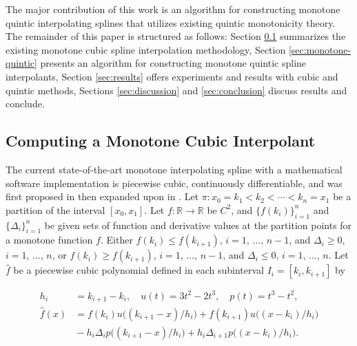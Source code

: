\documentclass{scspaperproc}
\theoremstyle{scsthe}
\begin{document}

The major contribution of this work is an algorithm for constructing monotone quintic interpolating splines that utilizes existing quintic monotonicity theory. The remainder of this paper is structured as follows: Section \ref{sec:monotone-cubic} summarizes the existing monotone cubic spline interpolation methodology, Section \ref{sec:monotone-quintic} presents an algorithm for constructing monotone quintic spline interpolants, Section \ref{sec:results} offers experiments and results with cubic and quintic methods, Sections \ref{sec:discussion} and \ref{sec:conclusion} discuss results and conclude.


\subsection{Computing a Monotone Cubic Interpolant}
\label{sec:monotone-cubic}

The current state-of-the-art monotone interpolating spline with a mathematical software implementation is piecewise cubic, continuously differentiable, and was first proposed in \cite{fritsch1980monotone} then expanded upon in \cite{carlson1985monotone}. Let $\pi: x_0 = k_1 < k_2 < \cdots < k_n = x_1$ be a partition of the interval $[x_0,x_1]$. Let $f: \mathbb{R} \rightarrow \mathbb{R}$ be $C^2$, and $\bigl\{f(k_i)\bigr\}_{i=1}^n$ and $\bigl\{\Delta_i\bigr\}_{i=1}^n$ be given sets of function and derivative values at the partition points for a monotone function $f$. Either $f(k_i) \leq f(k_{i+1})$, $i=1$, $\ldots$, $n-1$, and $\Delta_i\ge0$, $i=1$, $\ldots$, $n$, or $f(k_i) \geq f(k_{i+1})$, $i=1$, $\ldots$, $n-1$, and $\Delta_i\le0$, $i=1$, $\ldots$, $n$. Let $\hat f$ be a piecewise cubic polynomial defined in each subinterval $I_i = [k_i, k_{i+1}]$ by

\begin{align*}
h_i &= k_{i+1} - k_{i}, \quad
u(t) = 3t^2 - 2t^3, \quad
p(t) = t^3 - t^2,\\
\hat f(x) &= f(k_i) u\big((k_{i+1} - x) / h_i\big) +
f(k_{i+1}) u\big((x - k_i) / h_i\big) \\
&{} - h_i\Delta_i p\big((k_{i+1}-x)/h_i\big) + h_i\Delta_{i+1}
p\big((x-k_i)/h_i\big).
\end{align*}
\end{document}
